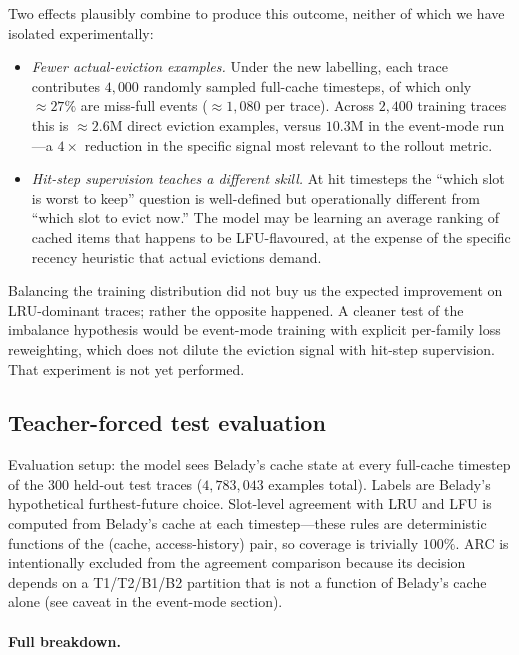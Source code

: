 \documentclass{article}
\begin{document}
Two effects plausibly combine to produce this outcome, neither of which we
have isolated experimentally:

\begin{itemize}
    \item \emph{Fewer actual-eviction examples.} Under the new labelling,
    each trace contributes $4{,}000$ randomly sampled full-cache timesteps,
    of which only $\approx\!27\%$ are miss-full events
    ($\approx\!1{,}080$ per trace). Across $2{,}400$ training traces this is
    $\approx\!2.6$M direct eviction examples, versus $10.3$M in the
    event-mode run---a $4\times$ reduction in the specific signal most
    relevant to the rollout metric.

    \item \emph{Hit-step supervision teaches a different skill.} At hit
    timesteps the ``which slot is worst to keep'' question is well-defined
    but operationally different from ``which slot to evict now.'' The model
    may be learning an average ranking of cached items that happens to be
    LFU-flavoured, at the expense of the specific recency heuristic that
    actual evictions demand.
\end{itemize}

Balancing the training distribution did not buy us the expected
improvement on LRU-dominant traces; rather the opposite happened. A
cleaner test of the imbalance hypothesis would be event-mode training with
explicit per-family loss reweighting, which does not dilute the eviction
signal with hit-step supervision. That experiment is not yet performed.

\subsection{Teacher-forced test evaluation}

Evaluation setup: the model sees Belady's cache state at every full-cache
timestep of the 300 held-out test traces ($4{,}783{,}043$ examples total).
Labels are Belady's hypothetical furthest-future choice. Slot-level
agreement with LRU and LFU is computed from Belady's cache at each
timestep---these rules are deterministic functions of the
(cache, access-history) pair, so coverage is trivially $100\%$. ARC is
intentionally excluded from the agreement comparison because its decision
depends on a T1/T2/B1/B2 partition that is not a function of Belady's
cache alone (see caveat in the event-mode section).

\paragraph{Full breakdown.}
\end{document}
